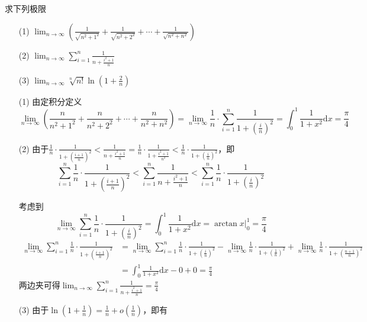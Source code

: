 \begin{xiti}
\begin{solution}
\end{solution}
\item 求下列极限
\begin{enumerate}
	\item[(1)] $\lim _ { n \rightarrow \infty } \left( \frac { 1 } { \sqrt { n ^ { 2 } + 1 ^ { 2 } } } + \frac { 1 } { \sqrt { n ^ { 2 } + 2 ^ { 2 } } } + \cdots + \frac { 1 } { \sqrt { n ^ { 2 } + n ^ { 2 } } } \right)$
	\item[(2)] $\lim _ { n \rightarrow \infty } \sum _ { i = 1 } ^ { n } \frac { 1 } { n + \frac { i ^ { 2 } + 1 } { n } }$
	\item[(3)] $\lim _ { n \rightarrow \infty } \sqrt [ n ] { n ! } \ln \left( 1 + \frac { 2 } { n } \right)$
\end{enumerate}
\begin{solution}
	
	\begin{enumerate}
		\item[(1)] 由定积分定义\[\lim _ { n \rightarrow \infty } \left(\frac { n } { n ^ { 2 } + 1 ^ { 2 } } + \frac { n } { n ^ { 2 } + 2 ^ { 2 } } + \cdots + \frac { n } { n ^ { 2 } + n ^ { 2 } } \right)= \lim _ { n \rightarrow \infty } \frac { 1 } { n } \cdot\sum _ { i = 1 } ^ { n } \frac { 1 } { 1 + \left( \frac { i } { n } \right) ^ { 2 } }  = \int _ { 0 } ^ { 1 } \frac { 1 } { 1 + x ^ { 2 } } \mathrm{ d } x = \frac { \pi } { 4 }\]
		\item[(2)] 由于$\frac{1}{n} \cdot \frac{1}{1+\left(\frac{i+1}{n}\right)^{2}}<\frac{1}{n+\frac{i^{2}+1}{n}}=\frac{1}{n} \cdot \frac{1}{1+\frac{i^{2}+1}{n^{2}}}<\frac{1}{n} \cdot \frac{1}{1+\left(\frac{i}{n}\right)^{2}}$，即
		\[\sum_{i=1}^{n} \frac{1}{n} \cdot \frac{1}{1+\left(\frac{i+1}{n}\right)^{2}}<\sum_{i=1}^{n} \frac{1}{n+\frac{i^{2}+1}{n}}<\sum_{i=1}^{n} \frac{1}{n} \cdot \frac{1}{1+\left(\frac{i}{n}\right)^{2}}\]
		
		考虑到
		\[
		\lim _{n \rightarrow \infty} \sum_{i=1}^{n} \frac{1}{n} \cdot \frac{1}{1+\left(\frac{i}{n}\right)^{2}}=\int_{0}^{1} \frac{1}{1+x^{2}} \mathrm{d} x=\arctan \left.x\right|_{0} ^{1}=\frac{\pi}{4}\]
		\begin{align*}
		\lim _{n \rightarrow \infty} \sum_{i=1}^{n} \frac{1}{n} \cdot \frac{1}{1+\left(\frac{i+1}{n}\right)^{2}}&=\lim _{n \rightarrow \infty} \sum_{i=1}^{n} \frac{1}{n} \cdot \frac{1}{1+\left(\frac{i}{n}\right)^{2}}-\lim _{n \rightarrow \infty} \frac{1}{n} \cdot \frac{1}{1+\left(\frac{1}{n}\right)^{2}}+\lim _{n \rightarrow \infty} \frac{1}{n} \cdot \frac{1}{1+\left(\frac{n+1}{n}\right)^{2}}\\
		&=\int_{0}^{1} \frac{1}{1+x^{2}} \mathrm{d} x-0+0=\frac{\pi}{4}
		\end{align*}
		两边夹可得$
		\lim _{n \rightarrow \infty} \sum_{i=1}^{n} \frac{1}{n+\frac{i^{2}+1}{n}}=\frac{\pi}{4}$
		\item[(3)] 由于$\ln(1+\frac{1}{n}) =\frac{1}{n}+o(\frac{1}{n})$，即有
		

\end{enumerate}
\end{solution}
\end{xiti}
